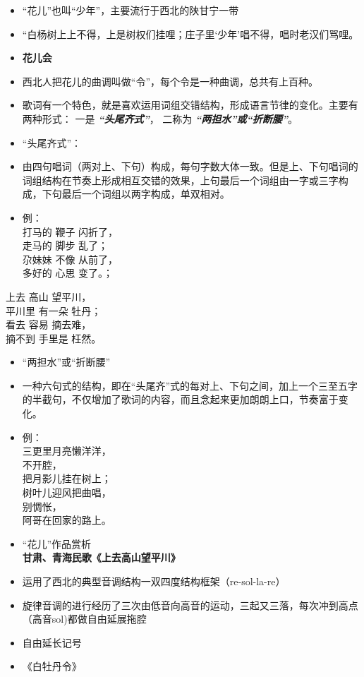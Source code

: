 \documentclass[
]{article}
\begin{document}
\begin{itemize}
\item
  ``花儿''也叫``少年''，主要流行于西北的陕甘宁一带
\item
  ``白杨树上上不得，上是树权们挂哩；庄子里`少年'唱不得，唱时老汉们骂哩。
\item
  \textbf{花儿会}
\item
  西北人把花儿的曲调叫做``令''，每个令是一种曲调，总共有上百种。
\item
  歌词有一个特色，就是喜欢运用词组交错结构，形成语言节律的变化。主要有两种形式：
  一是 \emph{\textbf{``头尾齐式''}}， 二称为
  \emph{\textbf{``两担水''或``折断腰''}}。
\item
  ``头尾齐式''：
\item
  由四句唱词（两对上、下句）构成，每句字数大体一致。但是上、下句唱词的词组结构在节奏上形成相互交错的效果，上句最后一个词组由一字或三字构成，下句最后一个词组以两字构成，单双相对。
\item
  例：\\
  打马的 鞭子 闪折了，\\
  走马的 脚步 乱了；\\
  尕妹妹 不像 从前了，\\
  多好的 心思 变了。；
\end{itemize}

上去 高山 望平川，\\
平川里 有一朵 牡丹；\\
看去 容易 摘去难，\\
摘不到 手里是 枉然。

\begin{itemize}
\item
  ``两担水''或``折断腰''
\item
  一种六句式的结构，即在``头尾齐''式的每对上、下句之间，加上一个三至五字的半截句，不仅增加了歌词的内容，而且念起来更加朗朗上口，节奏富于变化。
\item
  例：\\
  三更里月亮懒洋洋，\\
  不开腔，\\
  把月影儿挂在树上；\\
  树叶儿迎风把曲唱，\\
  别惆怅，\\
  阿哥在回家的路上。
\item
  ``花儿''作品赏析\\
  \textbf{甘肃、青海民歌《上去高山望平川》}
\item
  运用了西北的典型音调结构一双四度结构框架（re-sol-la-re）
\item
  旋律音调的进行经历了三次由低音向高音的运动，三起又三落，每次冲到高点（高音sol)都做自由延展拖腔
\item
  自由延长记号
\item
  《白牡丹令》
\end{itemize}
\end{document}
